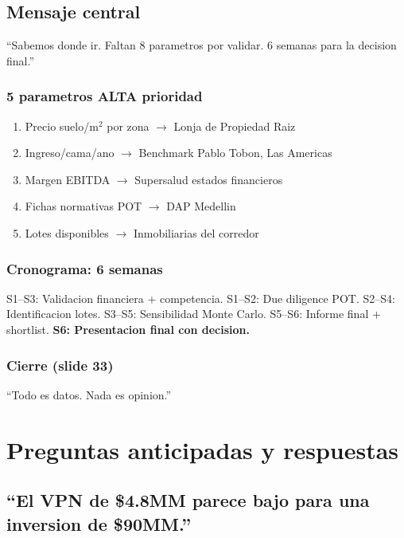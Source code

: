 \documentclass[11pt, a4paper]{article}
\begin{document}
\subsection{Mensaje central}

\begin{cita}
``Sabemos donde ir. Faltan 8 parametros por validar. 6 semanas para la decision final.''
\end{cita}

\subsubsection{5 parametros ALTA prioridad}
\begin{enumerate}[nosep]
  \item Precio suelo/m$^2$ por zona $\to$ Lonja de Propiedad Raiz
  \item Ingreso/cama/ano $\to$ Benchmark Pablo Tobon, Las Americas
  \item Margen EBITDA $\to$ Supersalud estados financieros
  \item Fichas normativas POT $\to$ DAP Medellin
  \item Lotes disponibles $\to$ Inmobiliarias del corredor
\end{enumerate}

\subsubsection{Cronograma: 6 semanas}
S1--S3: Validacion financiera + competencia. S1--S2: Due diligence POT. S2--S4: Identificacion lotes. S3--S5: Sensibilidad Monte Carlo. S5--S6: Informe final + shortlist. \textbf{S6: Presentacion final con decision.}

\subsubsection{Cierre (slide 33)}

\begin{cita}
``Todo es datos. Nada es opinion.''
\end{cita}

\section{Preguntas anticipadas y respuestas}

\subsection{``El VPN de \$4.8MM parece bajo para una inversion de \$90MM.''}
\end{document}
